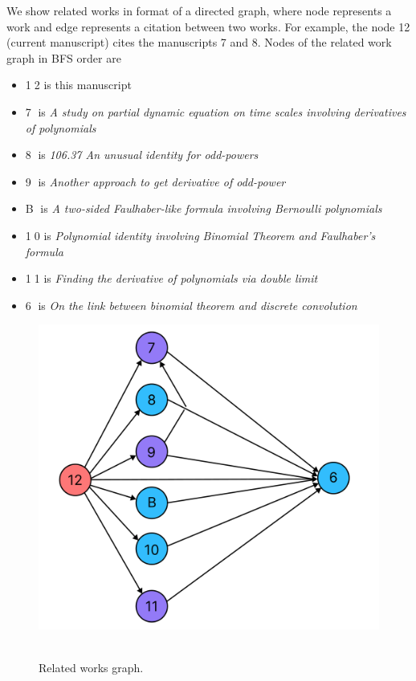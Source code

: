 We show related works in format of a directed graph, where node represents
a work and edge represents a citation between two works.
For example, the node 12 (current manuscript) cites the manuscripts 7 and 8.
Nodes of the related work graph in BFS order are
\begin{itemize}
    \item {\Large \textcircled{\normalsize 12}} is this manuscript
    \item {\Large \textcircled{\normalsize 7}} is \textit{A study on partial dynamic equation on time scales involving derivatives
    of polynomials}~\cite{study_on_partial_dynamic_eq_on_time_scales_with_poly_derivatives}
    \item {\Large \textcircled{\normalsize 8}} is \textit{106.37 An unusual identity for odd-powers}~\cite{unusual_identity_for_odd_powers}
    \item {\Large \textcircled{\normalsize 9}} is \textit{Another approach to get derivative of odd-power}~\cite{another_approach_to_get_derivative_of_odd_power}
    \item {\Large \textcircled{\normalsize B}} is \textit{A two-sided Faulhaber-like formula involving Bernoulli polynomials}~\cite{barbero2020two}
    \item {\Large \textcircled{\normalsize 10}} is \textit{Polynomial identity involving Binomial Theorem and Faulhaber's formula}~\cite{polynomial_identity_with_binomial_theorem_and_faulhabers_formula}
    \item {\Large \textcircled{\normalsize 11}} is \textit{Finding the derivative of polynomials via double limit}~\cite{derivative_of_polynomials_via_double_limit}
    \item {\Large \textcircled{\normalsize 6}} is \textit{On the link between binomial theorem and discrete convolution}~\cite{on_the_link_between_binomial_theorem_and_discrete_convolution}
\end{itemize}
\begin{figure}[H]
    \centering
    \includegraphics[width=1\textwidth]{images/realated_works_graph}
    ~\caption{Related works graph.}\label{fig:related-works-graph}
\end{figure}
